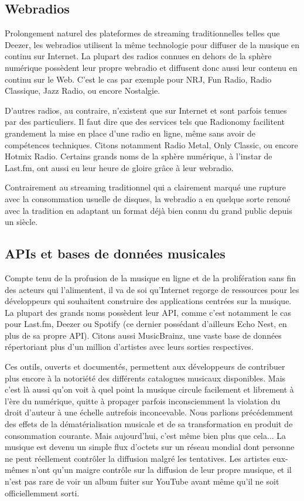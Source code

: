 \documentclass[a4paper,12pt]{article}
\begin{document}
\subsection{Webradios}

Prolongement naturel des plateformes de streaming traditionnelles telles que Deezer, les webradios utilisent la même technologie pour diffuser de la musique en continu sur Internet. La plupart des radios connues en dehors de la sphère numérique possèdent leur propre webradio et diffusent donc aussi leur contenu en continu sur le Web. C'est le cas par exemple pour NRJ, Fun Radio, Radio Classique, Jazz Radio, ou encore Nostalgie. 

D'autres radios, au contraire, n'existent que sur Internet et sont parfois tenues par des particuliers. Il faut dire que des services tels que Radionomy facilitent grandement la mise en place d'une radio en ligne, même sans avoir de compétences techniques. Citons notamment Radio Metal, Only Classic, ou encore Hotmix Radio. Certains grands noms de la sphère numérique, à l'instar de Last.fm, ont aussi eu leur heure de gloire grâce à leur webradio.

Contrairement au streaming traditionnel qui a clairement marqué une rupture avec la consommation usuelle de disques, la webradio a en quelque sorte renoué avec la tradition en adaptant un format déjà bien connu du grand public depuis un siècle.

\subsection{APIs et bases de données musicales}

Compte tenu de la profusion de la musique en ligne et de la prolifération sans fin des acteurs qui l'alimentent, il va de soi qu'Internet regorge de ressources pour les développeurs qui souhaitent construire des applications centrées sur la musique. La plupart des grands noms possèdent leur API, comme c'est notamment le cas pour Last.fm, Deezer ou Spotify (ce dernier possédant d'ailleurs Echo Nest, en plus de sa propre API). Citons aussi MusicBrainz, une vaste base de données répertoriant plus d'un million d'artistes avec leurs sorties respectives.

Ces outils, ouverts et documentés, permettent aux développeurs de contribuer plus encore à la notoriété des différents catalogues musicaux disponibles. Mais c'est là aussi qu'on voit à quel point la musique circule facilement et librement à l'ère du numérique, quitte à propager parfois inconsciemment la violation du droit d'auteur à une échelle autrefois inconcevable. Nous parlions précédemment des effets de la dématérialisation musicale et de sa transformation en produit de consommation courante. Mais aujourd'hui, c'est même bien plus que cela... La musique est devenu un simple flux d'octets sur un réseau mondial dont personne ne peut réellement contrôler la diffusion malgré les tentatives. Les artistes eux-mêmes n'ont qu'un maigre contrôle sur la diffusion de leur propre musique, et il n'est pas rare de voir un album fuiter sur YouTube avant même qu'il ne soit officiellemment sorti.
\end{document}
